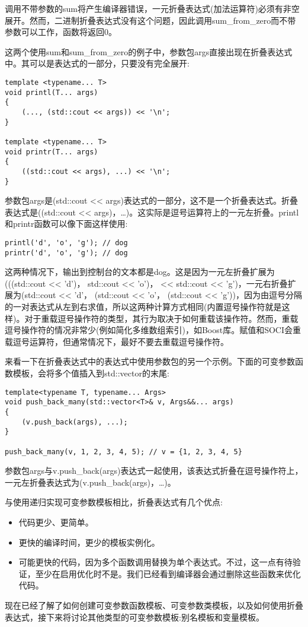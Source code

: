调用不带参数的sum将产生编译器错误，一元折叠表达式(加法运算符)必须有非空展开。然而，二进制折叠表达式没有这个问题，因此调用sum\_from\_zero而不带参数可以工作，函数将返回0。

这两个使用sum和sum\_from\_zero的例子中，参数包args直接出现在折叠表达式中。其可以是表达式的一部分，只要没有完全展开:

\begin{lstlisting}[style=styleCXX]
template <typename... T>
void printl(T... args)
{
	(..., (std::cout << args)) << '\n';
}

template <typename... T>
void printr(T... args)
{
	((std::cout << args), ...) << '\n';
}
\end{lstlisting}

参数包args是(std::cout <{}< args)表达式的一部分，这不是一个折叠表达式。折叠表达式是((std::cout <{}< args)，…)。这实际是逗号运算符上的一元左折叠。printl和printr函数可以像下面这样使用:

\begin{lstlisting}[style=styleCXX]
printl('d', 'o', 'g'); // dog
printr('d', 'o', 'g'); // dog
\end{lstlisting}

这两种情况下，输出到控制台的文本都是dog。这是因为一元左折叠扩展为(((std::cout <{}< 'd')， std::cout <{}< 'o')， << std::cout <{}< 'g')，一元右折叠扩展为(std::cout <{}< 'd'， (std::cout <{}< 'o'， (std::cout <{}< 'g'))，因为由逗号分隔的一对表达式从左到右求值，所以这两种计算方式相同(内置逗号操作符就是这样)。对于重载逗号操作符的类型，其行为取决于如何重载该操作符。然而，重载逗号操作符的情况非常少(例如简化多维数组索引)，如Boost库。赋值和SOCI会重载逗号运算符，但通常情况下，最好不要去重载逗号操作符。

来看一下在折叠表达式中的表达式中使用参数包的另一个示例。下面的可变参数函数模板，会将多个值插入到std::vector的末尾:

\begin{lstlisting}[style=styleCXX]
template<typename T, typename... Args>
void push_back_many(std::vector<T>& v, Args&&... args)
{
	(v.push_back(args), ...);
}

push_back_many(v, 1, 2, 3, 4, 5); // v = {1, 2, 3, 4, 5}
\end{lstlisting}

参数包args与v.push\_back(args)表达式一起使用，该表达式折叠在逗号操作符上，一元左折叠表达式为(v.push\_back(args)，…)。

与使用递归实现可变参数模板相比，折叠表达式有几个优点:

\begin{itemize}
\item
代码更少、更简单。

\item
更快的编译时间，更少的模板实例化。

\item
可能更快的代码，因为多个函数调用替换为单个表达式。不过，这一点有待验证，至少在启用优化时不是。我们已经看到编译器会通过删除这些函数来优化代码。
\end{itemize}

现在已经了解了如何创建可变参数函数模板、可变参数类模板，以及如何使用折叠表达式，接下来将讨论其他类型的可变参数模板:别名模板和变量模板。





















